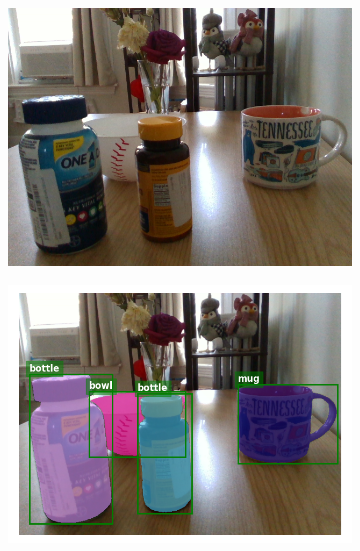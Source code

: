 \documentclass{article}
\begin{document}
\begin{figure}[]
    \begin{subfigure}{(\linewidth - 0.05\linewidth)/5}
        \centering
        \includegraphics[width=\linewidth]{figures/real2sim2real/7/1.png}
    \end{subfigure}
    \begin{subfigure}{(\linewidth - 0.05\linewidth)/5}
        \centering
        \includegraphics[width=\linewidth]{figures/real2sim2real/7/0.png}
    \end{subfigure}
    \begin{subfigure}{(\linewidth - 0.05\linewidth)/5}
        \centering

\end{subfigure}
\end{figure}
\end{document}
